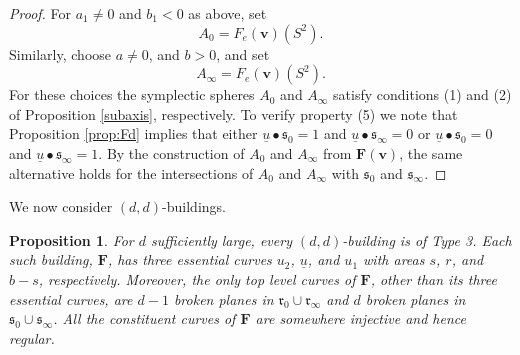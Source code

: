\documentclass[12pt]{amsart}
\newtheorem{proposition}[theorem]{Proposition}
\theoremstyle{definition}
\begin{document}
\begin{proof}
For $a_1\neq 0$ and  $b_1<0$ as above, set $$A_0 = F_e(\mathbf{v})(S^2).$$
Similarly, choose $a\neq 0$, and  $b>0$, and set $$A_\infty = F_e(\mathbf{v})(S^2).$$ For these choices the symplectic spheres $A_0$ and $A_\infty$ satisfy conditions (1) and (2) of Proposition \ref{subaxis}, respectively. To verify property (5) we note that Proposition \ref{prop:Fd} implies that either $\underline{u} \bullet \mathfrak{s}_0 =1$ and  $\underline{u} \bullet \mathfrak{s}_\infty =0$ or $\underline{u} \bullet \mathfrak{s}_0 =0$ and  $\underline{u} \bullet \mathfrak{s}_\infty =1$. By the construction of $A_0$ and $A_{\infty}$ from $\mathbf{F}(\mathbf{v})$, the same alternative holds for the intersections of $A_0$ and $A_{\infty}$ with  $\mathfrak{s}_0 $ and  $\mathfrak{s}_\infty$.

\end{proof}

We now consider $(d,d)$-buildings. 


\begin{proposition}\label{prop:dd} For $d$ sufficiently large, every $(d,d)$-building is of Type 3. Each such building, $\mathbf{F}$, has three essential curves $u_2$, $\underline{u}$, and $u_1$ with areas $s$, $r$, and $b-s$, respectively. Moreover, the only top level curves of $\mathbf{F}$, other than its three essential curves, are $d-1$ broken planes in $\mathfrak{r}_0 \cup \mathfrak{r}_{\infty}$ and $d$ broken planes in $\mathfrak{s}_0 \cup \mathfrak{s}_{\infty}$. 
All the constituent curves of  $\mathbf{F}$ are somewhere injective and hence regular. 
\end{proposition}



\end{document}

